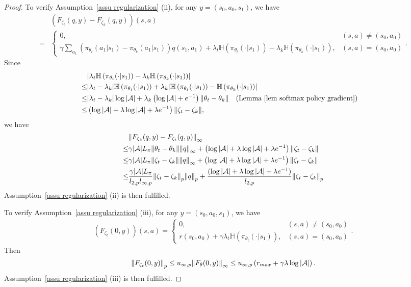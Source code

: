 \documentclass[twoside,11pt]{article}
\newcommand{\fA}{\mathcal{A}}
\newcommand{\na}{{|\fA|}}
\newcommand{\ent}[1]{\mathbb{H}\left(#1\right)}
\numberwithin{assucounter}{section}
\begin{document}
\begin{proof}
  To verify Assumption~\ref{assu regularization} (ii),
  for any $y = (s_0, a_0, s_1)$,
  we have
  \begin{align}
    &\left(F_{\zeta_t}(q, y) - F_{\zeta_k}(q, y)\right)(s, a) \\
    =& \begin{cases}
      0, & (s, a) \neq (s_0, a_0) \\
      \gamma \sum_{a_1} \left(\pi_{\theta_t}(a_1| s_1) - \pi_{\theta_k}(a_1|s_1) \right) q(s_1, a_1) + \lambda_t \ent{\pi_{\theta_t}(\cdot|s_1)} - \lambda_k \ent{\pi_{\theta_k}(\cdot|s_1)}, &(s, a) = (s_0, a_0)
    \end{cases}.
  \end{align}
  Since 
  \begin{align}
    &\abs{\lambda_t \ent{\pi_{\theta_t}(\cdot|s_1)} - \lambda_k \ent{\pi_{\theta_k}(\cdot|s_1)}} \\
    \leq & \abs{\lambda_t - \lambda_k} \ent{\pi_{\theta_t}(\cdot | s_1)} + \lambda_k \abs{\ent{\pi_{\theta_t}(\cdot | s_1)} - \ent{\pi_{\theta_k}(\cdot | s_1)}} \\
    \leq & \abs{\lambda_t - \lambda_k} \log \na + \lambda_k \left(\log \na + e^{-1}\right) \norm{\theta_t - \theta_k} \qq{(Lemma \ref{lem softmax policy gradient})} \\
    \leq & \left(\log \na + \lambda \log \na + \lambda e^{-1}\right) \norm{\zeta_t - \zeta_k},
  \end{align}
  we have
  \begin{align}
    &\norm{F_{\zeta_k}(q, y) - F_{\zeta_t}(q, y)}_\infty \\ 
    \leq& \gamma \na L_\pi \norm{\theta_t - \theta_k}\norm{q}_\infty + \left(\log \na + \lambda \log \na + \lambda e^{-1}\right) \norm{\zeta_t - \zeta_k} \\
    \leq& \gamma \na L_\pi \norm{\zeta_t - \zeta_k}\norm{q}_\infty + \left(\log \na + \lambda \log \na + \lambda e^{-1}\right) \norm{\zeta_t - \zeta_k} \\
    \leq& \frac{\gamma \na L_\pi}{l_{2, p} l_{\infty, p}} \norm{\zeta_t - \zeta_k}_p \norm{q}_p + \frac{(\log \na + \lambda \log \na + \lambda e^{-1})}{l_{2, p}} \norm{\zeta_t - \zeta_k}_p
  \end{align}
  Assumption~\ref{assu regularization} (ii) is then fulfilled. 

  To verify Assumption~\ref{assu regularization} (iii), 
  for any $y = (s_0, a_0, s_1)$,
  we have
  \begin{align}
    \left(F_{\zeta_t}(0, y)\right)(s, a) = \begin{cases}
      0, & (s, a) \neq (s_0, a_0) \\
      r(s_0, a_0) + \gamma \lambda_t \ent{\pi_{\theta_t}(\cdot | s_1)}, &(s, a) = (s_0, a_0)
    \end{cases}.
  \end{align}
  Then 
  \begin{align}
    \norm{F_{\zeta_t}(0, y)}_p \leq u_{\infty, p} \norm{F_\theta(0, y)}_\infty \leq  u_{\infty, p}\left(r_{max} + \gamma \lambda \log \na \right).
  \end{align}
  Assumption~\ref{assu regularization} (iii) is then fulfilled.


\end{proof}
\end{document}
